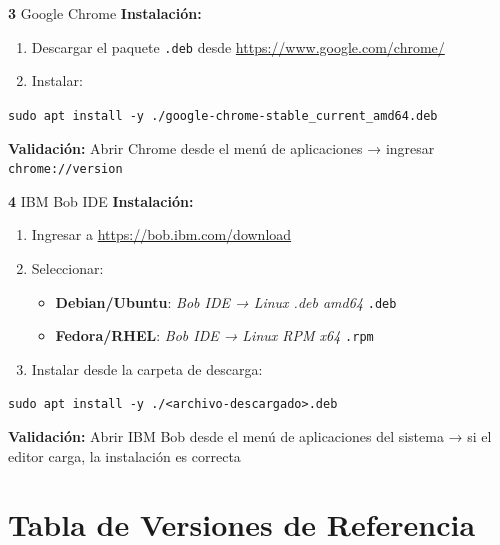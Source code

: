\documentclass[11pt, a4paper]{article}
\newcommand{\cmd}[1]{\texttt{\textcolor{ibmdark}{\small #1}}}
\newcommand{\checkmark}{\textcolor{ibmgreen}{\faCheckCircle}}
\begin{document}
\vspace{6pt}
\begin{labbox}[ibmdark]{\textbf{3} \quad Google Chrome}
\textbf{Instalación:}
\begin{enumerate}[leftmargin=*, nosep]
  \item Descargar el paquete \texttt{.deb} desde \url{https://www.google.com/chrome/}
  \item Instalar:
\end{enumerate}
\begin{center}
  \cmd{sudo apt install -y ./google-chrome-stable\_current\_amd64.deb}
\end{center}
\vspace{4pt}
\textbf{Validación:} Abrir Chrome desde el menú de aplicaciones → ingresar \cmd{chrome://version} \checkmark
\end{labbox}

\vspace{6pt}
\begin{labbox}[ibmblue]{\textbf{4} \quad IBM Bob IDE}
\textbf{Instalación:}
\begin{enumerate}[leftmargin=*, nosep]
  \item Ingresar a \url{https://bob.ibm.com/download}
  \item Seleccionar:
    \begin{itemize}[nosep]
      \item \textbf{Debian/Ubuntu}: \emph{Bob IDE → Linux .deb amd64} \quad \texttt{.deb}
      \item \textbf{Fedora/RHEL}: \emph{Bob IDE → Linux RPM x64} \quad \texttt{.rpm}
    \end{itemize}
  \item Instalar desde la carpeta de descarga:
\end{enumerate}
\begin{center}
  \cmd{sudo apt install -y ./<archivo-descargado>.deb}
\end{center}
\vspace{4pt}
\textbf{Validación:} Abrir IBM Bob desde el menú de aplicaciones del sistema → si el editor carga, la instalación es correcta \checkmark
\end{labbox}

\section{Tabla de Versiones de Referencia}
\label{sec:versiones}
\end{document}
